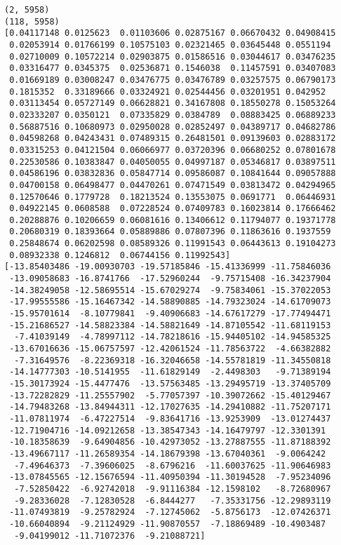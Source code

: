 \documentclass[11pt]{article}
\begin{document}
    \begin{Verbatim}[commandchars=\\\{\}]
(2, 5958)
(118, 5958)
[0.04117148 0.0125623  0.01103606 0.02875167 0.06670432 0.04908415
 0.02053914 0.01766199 0.10575103 0.02321465 0.03645448 0.0551194
 0.02710009 0.10572214 0.02903875 0.01586516 0.03044617 0.03476235
 0.03316477 0.0345375  0.02536871 0.1546038  0.11457591 0.03407083
 0.01669189 0.03008247 0.03476775 0.03476789 0.03257575 0.06790173
 0.1815352  0.33189666 0.03324921 0.02544456 0.03201951 0.042952
 0.03113454 0.05727149 0.06628821 0.34167808 0.18550278 0.15053264
 0.02333207 0.0350121  0.07335829 0.0384789  0.08883425 0.06889233
 0.56887516 0.10680973 0.02950028 0.02852497 0.04389717 0.04682786
 0.04598268 0.04243431 0.07489315 0.26481501 0.09139603 0.02883172
 0.03315253 0.04121504 0.06066977 0.03720396 0.06680252 0.07801678
 0.22530586 0.10383847 0.04050055 0.04997187 0.05346817 0.03897511
 0.04586196 0.03832836 0.05847714 0.09586087 0.10841644 0.09057888
 0.04700158 0.06498477 0.04470261 0.07471549 0.03813472 0.04294965
 0.12570646 0.1779728  0.18213524 0.13553075 0.0691771  0.06446931
 0.04922145 0.0608588  0.07228524 0.07409783 0.16023814 0.17666462
 0.20288876 0.10206659 0.06081616 0.13406612 0.11794077 0.19371778
 0.20680319 0.18393664 0.05889886 0.07807396 0.11863616 0.1937559
 0.25848674 0.06202598 0.08589326 0.11991543 0.06443613 0.19104273
 0.08932338 0.1246812  0.06744156 0.11992543]
[-13.85403486 -19.00930703 -19.57185846 -15.41336999 -11.75846036
 -13.09058683 -16.8741766  -17.52960244  -9.75715408 -16.34237904
 -14.38249058 -12.58695514 -15.67029274  -9.75834061 -15.37022053
 -17.99555586 -15.16467342 -14.58890885 -14.79323024 -14.61709073
 -15.95701614  -8.10779841  -9.40906683 -14.67617279 -17.77494471
 -15.21686527 -14.58823384 -14.58821649 -14.87105542 -11.68119153
  -7.41039149  -4.78997112 -14.78218616 -15.94405102 -14.94585325
 -13.67016636 -15.06757597 -12.42061524 -11.78563722  -4.66382882
  -7.31649576  -8.22369318 -16.32046658 -14.55781819 -11.34550818
 -14.14777303 -10.5141955  -11.61829149  -2.4498303   -9.71389194
 -15.30173924 -15.4477476  -13.57563485 -13.29495719 -13.37405709
 -13.72282829 -11.25557902  -5.77057397 -10.39072662 -15.40129467
 -14.79483268 -13.84944311 -12.17027635 -14.29410882 -11.75207171
 -11.07811974  -6.47227514  -9.83641716 -13.9253909  -13.01274437
 -12.71904716 -14.09212658 -13.38547343 -14.16479797 -12.3301391
 -10.18358639  -9.64904856 -10.42973052 -13.27887555 -11.87188392
 -13.49667117 -11.26589354 -14.18679398 -13.67040361  -9.0064242
  -7.49646373  -7.39606025  -8.6796216  -11.60037625 -11.90646983
 -13.07845565 -12.15676594 -11.40950394 -11.30194528  -7.95234096
  -7.52850422  -6.92742018  -9.91116384 -12.1598102   -8.72680967
  -9.28336028  -7.12830528  -6.8444277   -7.35331756 -12.29893119
 -11.07493819  -9.25782924  -7.12745062  -5.8756173  -12.07426371
 -10.66040894  -9.21124929 -11.90870557  -7.18869489 -10.4903487
  -9.04199012 -11.71072376  -9.21088721]

    \end{Verbatim}
\end{document}
